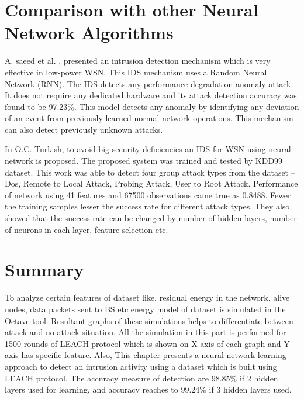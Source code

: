 \section{Comparison with other Neural Network Algorithms}
A. saeed et al. \cite{saeed2016random}, presented an intrusion detection mechanism which is very effective in low-power WSN. This IDS mechanism uses a Random Neural Network (RNN). The IDS detects any performance degradation anomaly attack. It does not require any dedicated hardware and its attack detection accuracy was found to be 97.23\%. This model detects any anomaly by identifying any deviation of an event from previously learned normal network operations. This mechanism can also detect previously unknown attacks.
\par
In \cite{Turkish2015ANN} O.C. Turkish, to avoid big security deficiencies an IDS for WSN using neural network is proposed. The proposed system was trained and tested by KDD99 dataset. This work was able to detect four group attack types from the dataset – Dos, Remote to Local Attack, Probing Attack, User to Root Attack. Performance of network using 41 features and 67500 observations came true as 0.8488. Fewer the training samples lesser the success rate for different attack types. They also showed that the success rate can be changed by number of hidden layers, number of neurons in each layer, feature selection etc.

\section{Summary}
To analyze certain features of dataset like, residual energy in the network, alive nodes, data packets sent to BS etc energy model of dataset is simulated in the Octave tool. Resultant graphs of these simulations helps to differentiate between attack and no attack situation. All the simulation in this part is performed for 1500 rounds of LEACH protocol which is shown on X-axis of each graph and Y-axis has specific feature. Also, This chapter presents a neural network learning approach to detect an intrusion activity using a dataset which is built using LEACH protocol. The accuracy measure of detection are 98.85\% if 2 hidden layers used for learning, and accuracy reaches to 99.24\% if 3 hidden layers used.